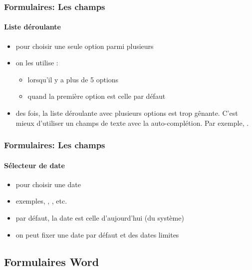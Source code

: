 \documentclass[xcolor=table]{beamer}
\begin{document}
\begin{frame}
\frametitle{Formulaires: Les champs}
\framesubtitle{Liste déroulante}

\begin{minipage}{0.69\textwidth}
	\begin{itemize}
		\item pour choisir une seule option parmi plusieurs
		\item on les utilise : 
		\begin{itemize}
			\item lorsqu'il y a plus de 5 options 
			\item quand la première option est celle par défaut
		\end{itemize}
		\item des fois, la liste déroulante avec plusieurs options est trop gênante. C'est mieux d'utiliser un champs de texte avec la auto-complétion. Par exemple, .
	\end{itemize}
\end{minipage}
\begin{minipage}{0.30\textwidth}
\end{minipage}

\end{frame}

\begin{frame}
\frametitle{Formulaires: Les champs}
\framesubtitle{Sélecteur de date}

\begin{minipage}{0.50\textwidth}
	\begin{itemize}
		\item pour choisir une date
		\item exemples, , , etc.
		\item par défaut, la date est celle d'aujourd'hui (du système)
		\item on peut fixer une date par défaut et des dates limites
	\end{itemize}
\end{minipage}
\begin{minipage}{0.49\textwidth}
\end{minipage}


\end{frame}

\subsection{Formulaires Word}
\end{document}
